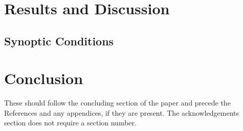 \documentclass[smallextended]{svjour3}
\begin{document}

\section{Results and Discussion}
\label{sec:res_disc}


\subsection{Synoptic Conditions}



\section{Conclusion}
\label{sec:conclusion}



\begin{acknowledgements}
These should follow the concluding section of the paper and precede the References and any appendices, if they are present. The acknowledgements section does not require a section number. 
\end{acknowledgements} 





\end{document}
